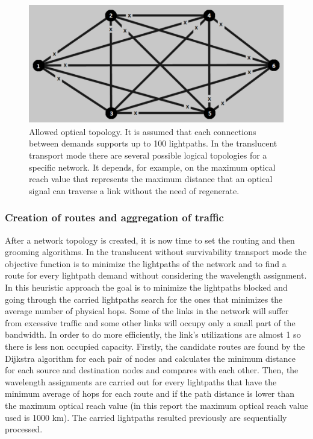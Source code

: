 \begin{figure}[H]
\centering
\includegraphics[width=12cm]{sdf/heuristic/translucent_survivability/figures/allowed_optical}
\caption{Allowed optical topology. It is assumed that each connections between demands supports up to 100 lightpaths. In the translucent transport mode there are several possible logical topologies for a specific network. It depends, for example, on the maximum optical reach value that represents the maximum distance that an optical signal can traverse a link without the need of regenerate.}
\label{allowed_optical_surv_translucent}
\end{figure}

\subsubsection{Creation of routes and aggregation of traffic}

\vspace{11pt}
After a network topology is created, it is now time to set the routing and then grooming algorithms. In the translucent without survivability transport mode the objective function is to minimize the lightpaths of the network and to find a route for every lightpath demand without considering the wavelength assignment. In this heuristic approach the goal is to minimize the lightpaths blocked and going through the carried lightpaths search for the ones that minimizes the average number of physical hops. Some of the links in the network will suffer from excessive traffic and some other links will occupy only a small part of the bandwidth. In order to do more efficiently, the link's utilizations are almost 1 so there is less non occupied capacity. Firstly, the candidate routes are found by the Dijkstra algorithm for each pair of nodes and calculates the minimum distance for each source and destination nodes and compares with each other. Then, the wavelength assignments are carried out for every lightpaths that have the minimum average of hops for each route and if the path distance is lower than the maximum optical reach value (in this report the maximum optical reach value used is 1000 km). The carried lightpaths resulted previously are sequentially processed.

